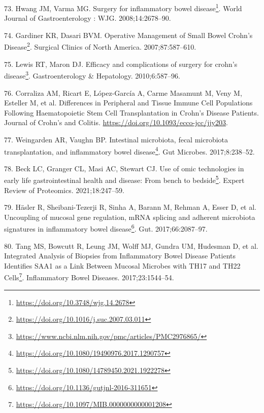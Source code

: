 \documentclass[
  a4paper,
]{book}
\DeclareRobustCommand{\href}[2]{#2\footnote{\url{#1}}}
\newlength{\cslhangindent}
\newlength{\cslentryspacingunit} %
\newenvironment{CSLReferences}[2] %
 {%
  \setlength{\parindent}{0pt}
  \ifodd #1
  \let\oldpar\par
  \def\par{\hangindent=\cslhangindent\oldpar}
  \fi
  \setlength{\parskip}{#2\cslentryspacingunit}
 }%
 {}
\begin{document}
\begin{CSLReferences}{0}{0}
\leavevmode{}%
73. Hwang JM, Varma MG. \href{https://doi.org/10.3748/wjg.14.2678}{Surgery for inflammatory bowel disease}. World Journal of Gastroenterology : WJG. 2008;14:2678--90.

\leavevmode{}%
74. Gardiner KR, Dasari BVM. \href{https://doi.org/10.1016/j.suc.2007.03.011}{Operative Management of Small Bowel Crohn's Disease}. Surgical Clinics of North America. 2007;87:587--610.

\leavevmode{}%
75. Lewis RT, Maron DJ. \href{https://www.ncbi.nlm.nih.gov/pmc/articles/PMC2976865/}{Efficacy and complications of surgery for crohn's disease}. Gastroenterology \& Hepatology. 2010;6:587--96.

\leavevmode{}%
76. Corraliza AM, Ricart E, López-García A, Carme Masamunt M, Veny M, Esteller M, et al. Differences in Peripheral and Tissue Immune Cell Populations Following Haematopoietic Stem Cell Transplantation in Crohn{'}s Disease Patients. Journal of Crohn's and Colitis. \url{https://doi.org/10.1093/ecco-jcc/jjy203}.

\leavevmode{}%
77. Weingarden AR, Vaughn BP. \href{https://doi.org/10.1080/19490976.2017.1290757}{Intestinal microbiota, fecal microbiota transplantation, and inflammatory bowel disease}. Gut Microbes. 2017;8:238--52.

\leavevmode{}%
78. Beck LC, Granger CL, Masi AC, Stewart CJ. \href{https://doi.org/10.1080/14789450.2021.1922278}{Use of omic technologies in early life gastrointestinal health and disease: From bench to bedside}. Expert Review of Proteomics. 2021;18:247--59.

\leavevmode{}%
79. Häsler R, Sheibani-Tezerji R, Sinha A, Barann M, Rehman A, Esser D, et al. \href{https://doi.org/10.1136/gutjnl-2016-311651}{Uncoupling of mucosal gene regulation, {mRNA} splicing and adherent microbiota signatures in inflammatory bowel disease}. Gut. 2017;66:2087--97.

\leavevmode{}%
80. Tang MS, Bowcutt R, Leung JM, Wolff MJ, Gundra UM, Hudesman D, et al. \href{https://doi.org/10.1097/MIB.0000000000001208}{Integrated Analysis of Biopsies from Inflammatory Bowel Disease Patients Identifies SAA1 as a Link Between Mucosal Microbes with TH17 and TH22 Cells}. Inflammatory Bowel Diseases. 2017;23:1544--54.


\end{CSLReferences}
\end{document}
